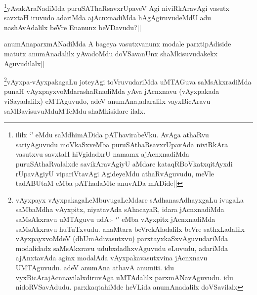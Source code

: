 \begin{artha}
\footnote{ililx `\stext' eMdu saMdhimADida pAThavirabeVku. AvAga athaRvu sariyAguvudu moVkaSxveMba puruSAthaRsavxrUpavAda niviRkAra vasutxvu savxtaH hiVgidadxrU namamx ajAcnxnadiMda puruSAthaRvalalxde savikAravAgiyU aMdare kataqRBoVkatxqitAyxdi rUpavAgiyU vipariVtavAgi AgideyeMdu athaRvAguvudu, meVle tadABUtaM eMba pAThadaMte anuvADa mADide||}yAvakAraNadiMda puruSAThaRsavxrUpaveV Agi niviRkAravAgi vasutx savxtaH iruvudo adariMda ajAcnxnadiMda hAgAgiruvudeMdU adu nashAvAdalilx beVre Enanunx beVDavudu?||
\end{artha}

\begin{artha}
anumAnaparxmANadiMda A bageya vasutxvanunx modale parxtipAdiside matutx anumAnadalilx yAvadoMdu doVSavanUnx shaMkisuvudakekx Aguvudilalx||
\end{artha}

\begin{artha}
\footnote{vAyxpayx vAyxpakagaLeMbuvugaLeMdare sAdhanasAdhayxgaLu ivugaLa saMbaMdha vAyxpitx, niyatavAda sAhacayaR, idara jAcnxnadiMda saMsAkxravu uMTAguvu udA:- `\stext' eMba vAyxpitx jAcnxnadiMda saMsAkxravu huTuTxvudu. anaMtara beVrekAladalilx  beVre sathxLadalilx vAyxpayxvoMdeV (dhUmAdivasutxvu) parxtayxkaSxvAguvudariMda modalidadx saMsAkxravu udubxdadhxvAguvudu eLuvudu, adariMda ajAnxtavAda aginx modalAda vAyxpakavasutxvina jAcnxnavu UMTAguvudu. adeV anumAna athavA anumiti. idu vyxBicArajAcnnavilalxdiruvAga uMTAdalilx parxmANavAguvudu. idu nidoRVSavAdudu. parxkaqtahiMde heVLida anumAnadalilx doVSavilalx}vAyxpa-vAyxpakagaLu joteyAgi toVruvudariMda uMTAGuva saMsAkxradiMda punaH vAyxpayxvoMdarashaRnadiMda yAva jAcnxnavu (vAyxpakada viSayadalilx) eMTAguvudo, adeV anumAna,adaralilx vayxBicAravu saMBavisuvuMduMTeMdu shaMkisidare ilalx.
\end{artha}



